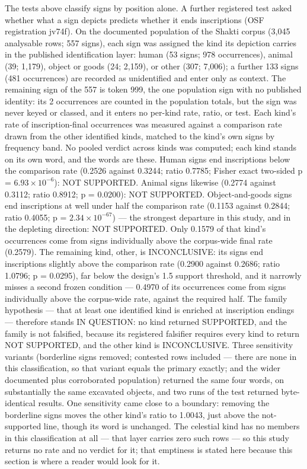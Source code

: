 \documentclass[11pt]{article}
\newcounter{none} %
\begin{document}
The tests above classify signs by position alone. A further
registered test asked whether what a sign depicts predicts
whether it ends inscriptions (OSF registration jv74f). On the documented population of the
Shakti corpus (3,045 analysable rows; 557 signs), each sign was
assigned the kind its depiction carries in the published
identification layer: human (53 signs; 978
occurrences), animal (39; 1,179), object or goods (24; 2,159),
or other (307; 7,006); a further 133 signs (481 occurrences)
are recorded as unidentified and enter only as context. The remaining sign of the 557 is token 999, the one population sign with no published identity: its 2 occurrences are counted in the population totals, but the sign was never keyed or classed, and it enters no per-kind rate, ratio, or test. Each
kind's rate of inscription-final occurrences was measured
against a comparison rate drawn from the other identified kinds, matched to the kind's own signs by frequency band. No pooled verdict across kinds was
computed; each kind stands on its own word, and the words are
these. Human signs end inscriptions below the comparison rate
(0.2526 against 0.3244; ratio 0.7785; Fisher exact two-sided
p = $6.93 \times 10^{-6}$): NOT SUPPORTED. Animal signs
likewise (0.2774 against 0.3112; ratio 0.8912; p = 0.0200):
NOT SUPPORTED. Object-and-goods signs end inscriptions at well
under half the comparison rate (0.1153 against 0.2844; ratio
0.4055; p = $2.34 \times 10^{-67}$) --- the strongest departure in this study, and in the depleting direction: NOT SUPPORTED.
Only 0.1579 of that kind's occurrences come from signs
individually above the corpus-wide final rate (0.2579). The
remaining kind, other, is INCONCLUSIVE: its signs end
inscriptions slightly above the comparison rate (0.2900
against 0.2686; ratio 1.0796; p = 0.0295), far below the
design's 1.5 support threshold, and it narrowly misses a second
frozen condition --- 0.4970 of its occurrences come from signs
individually above the corpus-wide rate, against the required
half. The family hypothesis --- that at least one identified
kind is enriched at inscription endings --- therefore stands IN QUESTION: no kind returned SUPPORTED, and the family is not falsified, because its registered falsifier requires every kind to return NOT SUPPORTED, and the other kind is INCONCLUSIVE. Three sensitivity
variants (borderline signs removed; contested rows included
--- there are none in this classification, so that variant
equals the primary exactly; and the wider documented plus
corroborated population) returned the same four words, on
substantially the same excavated objects, and two runs of the
test returned byte-identical results. One sensitivity came
close to a boundary: removing the borderline signs moves the
other kind's ratio to 1.0043, just above the not-supported
line, though its word is unchanged. The celestial kind has no
members in this classification at all --- that layer carries
zero such rows --- so this study returns no rate and no verdict for it; that emptiness is stated here because this section is where a reader would look for it.
\end{document}
